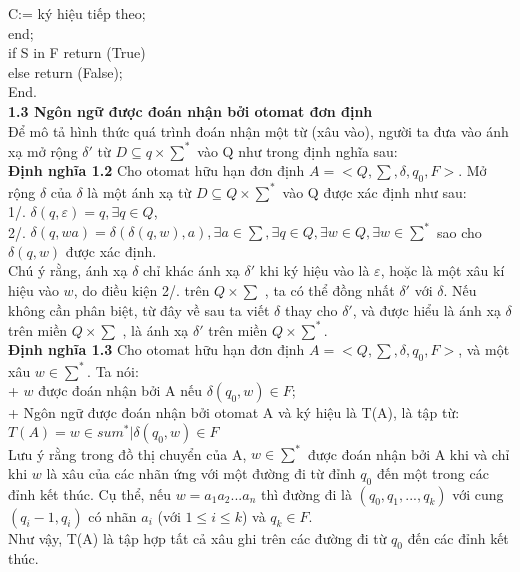 \begin{flushleft}
\hspace{30mm} C:= ký hiệu tiếp theo;\\
\hspace{20mm} end;\\
\hspace{10mm} if S in F return (True)\\
\hspace{10mm} else return (False);\\
End.\\
\textbf{1.3 Ngôn ngữ được đoán nhận bởi otomat đơn định}\\
Để mô tả hình thức quá trình đoán nhận một từ (xâu vào), người ta đưa vào ánh xạ mở rộng $\delta'$ từ $D \subseteq q \times \sum^*$ vào Q như trong định nghĩa sau: \\
\textbf{Định nghĩa 1.2} Cho otomat hữu hạn đơn định $A = <Q, \sum, \delta, q_0, F>$. Mở rộng $\delta$ của $\delta$ là một ánh xạ từ $D \subseteq Q \times \sum^*$ vào Q được xác định như sau: \\
1/. $\delta(q, \varepsilon) = q, \exists q \in Q$,\\
2/. $\delta(q, wa) = \delta(\delta(q, w), a), \exists a \in \sum, \exists q\in Q, \exists w \in Q, \exists w \in \sum^*$ sao cho $\delta(q, w)$ được xác định.\\
Chú ý rằng, ánh xạ $\delta$ chỉ khác ánh xạ $\delta'$ khi ký hiệu vào là $\varepsilon$, hoặc là một xâu kí hiệu vào $w$, do điều kiện 2/. trên $Q \times \sum$ , ta có thể đồng nhất $\delta'$ với $\delta$. Nếu không cần phân biệt, từ đây về sau ta viết $\delta$ thay cho $\delta'$, và được hiểu là ánh xạ $\delta$ trên miền $Q \times \sum$ , là ánh xạ $\delta'$ trên miền $Q \times \sum^*$.\\
\textbf{Định nghĩa 1.3} Cho otomat hữu hạn đơn định $A = <Q, \sum, \delta, q_0, F>$, và một xâu $w \in \sum^*$. Ta nói:\\
+ $w$ được đoán nhận bởi A nếu $\delta(q_0, w) \in F$;\\
+ Ngôn ngữ được đoán nhận bởi otomat A và ký hiệu là T(A), là tập từ:\\
$T(A) = {w \in sum^* | \delta(q_0, w) \in F}$\\
Lưu ý rằng trong đồ thị chuyển của A, $w \in \sum^*$ được đoán nhận bởi A khi và chỉ khi $w$ là xâu của các nhãn ứng với một đường đi từ đỉnh $q_0$ đến một trong các đỉnh kết thúc. Cụ thể, nếu $w= a_1a_2...a_n$ thì đường đi là $(q_0, q_1,..., q_k)$ với cung $(q_i-1, q_i)$ có nhãn $a_i$ (với $1 \le i \le k$) và $q_k \in F$.\\
Như vậy, T(A) là tập hợp tất cả xâu ghi trên các đường đi từ $q_0$ đến các đỉnh kết thúc.\\

\end{flushleft}
